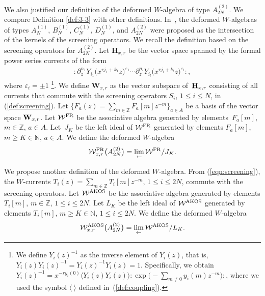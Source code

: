 \documentclass[10pt,a4paper]{amsart}
\numberwithin{equation}{section}
\begin{document}
We also justified our definition of
the deformed $W$-algebra of type $A_{2N}^{(2)}$.
We compare Definition \ref{def:3-3} with other definitions.
In~\cite{Frenkel-Reshetikhin1},
the deformed $W$-algebras of type{s}
$A_N^{(1)}$, $B_N^{(1)}$, $C_N^{(1)}$, $D_N^{(1)}$, and $A_{2N}^{(2)}$
were proposed as the intersection of the kernels of the screening operators.
We recall the definition based on the screening operators for
$A_{2N}^{(2)}$.
Let {{${\mathbf H}_{x,r}$}}
be the vector space spanned by
the formal power series currents of the form
\begin{gather*}
{:}\partial_z^{n_1} Y_{i_1}\big(x^{r j_1+k_1}{z}\big)^{\varepsilon_1}\cdots
\partial_z^{n_l} Y_{i_l}\big(x^{r j_l+k_l}{z}\big)^{\varepsilon_l}{:},
\end{gather*}
where $\varepsilon_i=\pm 1$
\footnote[2]{We define $Y_i(z)^{-1}$ as the inverse element of $Y_i(z)$, that is,
$Y_i(z) Y_i(z)^{-1}=Y_i(z)^{-1}Y_i(z)=1$. Specifically, we obtain
$Y_i(z)^{-1}=x^{-ry_i(0)}\langle Y_i(z)Y_i(z)\rangle
{:}\exp\bigl({-}\sum_{m \neq 0}y_i(m)z^{-m}\bigr){:}$,
where we used the symbol $\langle~\rangle$ defined in~(\ref{def:coupling}).}.
We define ${\mathbf W}_{x,r}$ as the vector subspace of~${\bf H}_{x,r}$
consisting of all currents that commute with the screening operators
$S_i$, $1\!\leq \!i \leq\! N$, in (\ref{def:screening}).
Let $\bigl\{F_a(z)\!=\!\sum_{m \in \mathbb{Z}}F_a[m]z^{-m}\bigr\}_{a \in A}$ be a basis of
the vector space ${\bf W}_{x,r}$. Let ${\mathcal W}^{\rm FR}$ be the associative algebra generated by
elements~$F_a[m]$, $m \in \mathbb{Z}$, $a \in A$.
Let~$J_K$ be the left ideal of ${\mathcal W}^{\rm FR}$
generated by elements $F_a[m]$, $m \geq K \in \mathbb{N}$, $a\in A$.
We define the deformed $W$-algebra
\begin{gather*}
{\mathcal W}_{x,r}^{\rm FR}\big(A_{2N}^{(2)}\big)=\lim_{\leftarrow}{\mathcal W}^{\rm FR}/J_K.
\end{gather*}

We propose another definition of the deformed $W$-algebra.
From (\ref{eqn:screening}), the $W$-currents
$T_i(z)=\sum_{m \in \mathbb{Z}}T_i[m]z^{-m}$, $1 \leq i \leq 2N$,
commute with the screening operators.
Let ${\mathcal W}^{\rm AKOS}$ be the associative algebra generated by
elements $T_i[m]$, $m \in \mathbb{Z}$, $1\leq i \leq 2N$.
Let $L_K$ be the left ideal of ${\mathcal W}^{\rm AKOS}$ generated by elements
$T_i[m]$, $m \geq K \in \mathbb{N}$, $1\leq i \leq 2N$.
We define the deformed $W$-algebra
\begin{gather*}
{\mathcal W}_{x,r}^{\rm AKOS}\big(A_{2N}^{(2)}\big)=\lim_{\leftarrow}{\mathcal W}^{\rm AKOS}/L_K.
\end{gather*}
\end{document}
